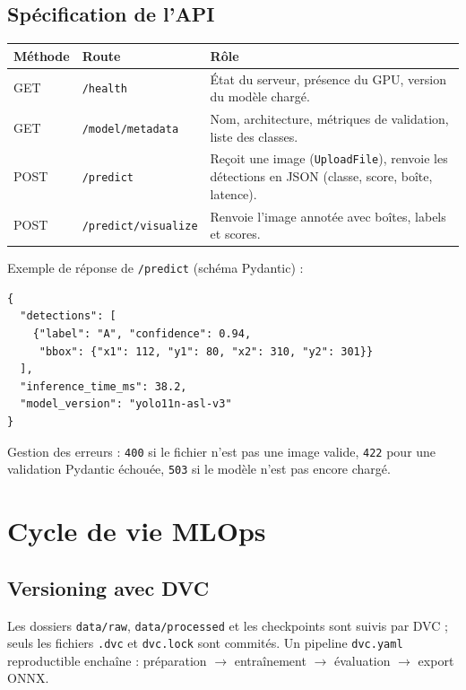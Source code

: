 \documentclass[11pt,a4paper]{article}
\begin{document}
\subsection{Spécification de l'API}

\begin{center}
\begin{tabular}{@{}llp{7.2cm}@{}}
\toprule
\textbf{Méthode} & \textbf{Route} & \textbf{Rôle} \\ \midrule
GET & \texttt{/health} & État du serveur, présence du GPU, version du modèle chargé. \\
GET & \texttt{/model/metadata} & Nom, architecture, métriques de validation, liste des classes. \\
POST & \texttt{/predict} & Reçoit une image (\texttt{UploadFile}), renvoie les détections en JSON (classe, score, boîte, latence). \\
POST & \texttt{/predict/visualize} & Renvoie l'image annotée avec boîtes, labels et scores. \\ \bottomrule
\end{tabular}
\end{center}

Exemple de réponse de \texttt{/predict} (schéma Pydantic) :
\begin{lstlisting}
{
  "detections": [
    {"label": "A", "confidence": 0.94,
     "bbox": {"x1": 112, "y1": 80, "x2": 310, "y2": 301}}
  ],
  "inference_time_ms": 38.2,
  "model_version": "yolo11n-asl-v3"
}
\end{lstlisting}

Gestion des erreurs : \texttt{400} si le fichier n'est pas une image valide, \texttt{422} pour une validation Pydantic échouée, \texttt{503} si le modèle n'est pas encore chargé.

\section{Cycle de vie MLOps}

\subsection{Versioning avec DVC}
Les dossiers \texttt{data/raw}, \texttt{data/processed} et les checkpoints sont suivis par DVC ; seuls les fichiers \texttt{.dvc} et \texttt{dvc.lock} sont commités. Un pipeline \texttt{dvc.yaml} reproductible enchaîne : préparation $\rightarrow$ entraînement $\rightarrow$ évaluation $\rightarrow$ export ONNX.
\end{document}
